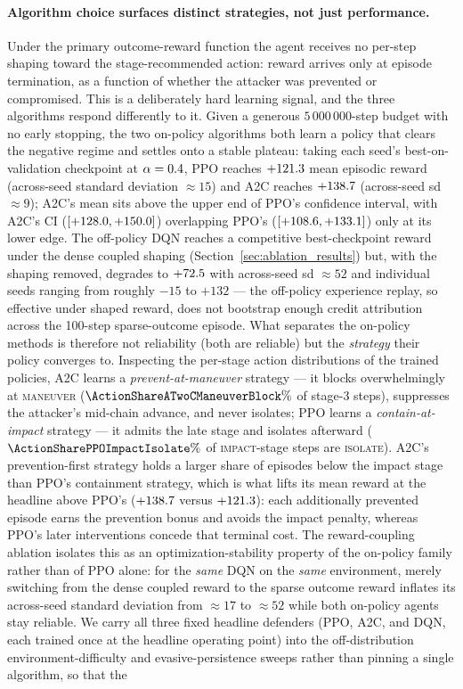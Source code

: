 \paragraph{Algorithm choice surfaces distinct strategies, not just performance.} Under the primary outcome-reward function the agent receives no per-step shaping toward the stage-recommended action: reward arrives only at episode termination, as a function of whether the attacker was prevented or compromised. This is a deliberately hard learning signal, and the three algorithms respond differently to it. Given a generous $5\,000\,000$-step budget with no early stopping, the two on-policy algorithms both learn a policy that clears the negative regime and settles onto a stable plateau: taking each seed's best-on-validation checkpoint at $\alpha = 0.4$, PPO reaches $+121.3$ mean episodic reward (across-seed standard deviation $\approx 15$) and A2C reaches $+138.7$ (across-seed sd $\approx 9$); A2C's mean sits above the upper end of PPO's confidence interval, with A2C's CI ($[+128.0, +150.0]$) overlapping PPO's ($[+108.6, +133.1]$) only at its lower edge. The off-policy DQN reaches a competitive best-checkpoint reward under the dense coupled shaping (Section~\ref{sec:ablation_results}) but, with the shaping removed, degrades to $+72.5$ with across-seed sd $\approx 52$ and individual seeds ranging from roughly $-15$ to $+132$ --- the off-policy experience replay, so effective under shaped reward, does not bootstrap enough credit attribution across the 100-step sparse-outcome episode. What separates the on-policy methods is therefore not reliability (both are reliable) but the \emph{strategy} their policy converges to. Inspecting the per-stage action distributions of the trained policies, A2C learns a \emph{prevent-at-maneuver} strategy --- it blocks overwhelmingly at \textsc{maneuver} ($\ActionShareATwoCManeuverBlock\%$ of stage-3 steps), suppresses the attacker's mid-chain advance, and never isolates; PPO learns a \emph{contain-at-impact} strategy --- it admits the late stage and isolates afterward ($\ActionSharePPOImpactIsolate\%$ of \textsc{impact}-stage steps are \textsc{isolate}). A2C's prevention-first strategy holds a larger share of episodes below the impact stage than PPO's containment strategy, which is what lifts its mean reward at the headline above PPO's ($+138.7$ versus $+121.3$): each additionally prevented episode earns the prevention bonus and avoids the impact penalty, whereas PPO's later interventions concede that terminal cost. The reward-coupling ablation isolates this as an optimization-stability property of the on-policy family rather than of PPO alone: for the \emph{same} DQN on the \emph{same} environment, merely switching from the dense coupled reward to the sparse outcome reward inflates its across-seed standard deviation from $\approx 17$ to $\approx 52$ while both on-policy agents stay reliable. We carry all three fixed headline defenders (PPO, A2C, and DQN, each trained once at the headline operating point) into the off-distribution environment-difficulty and evasive-persistence sweeps rather than pinning a single algorithm, so that the 